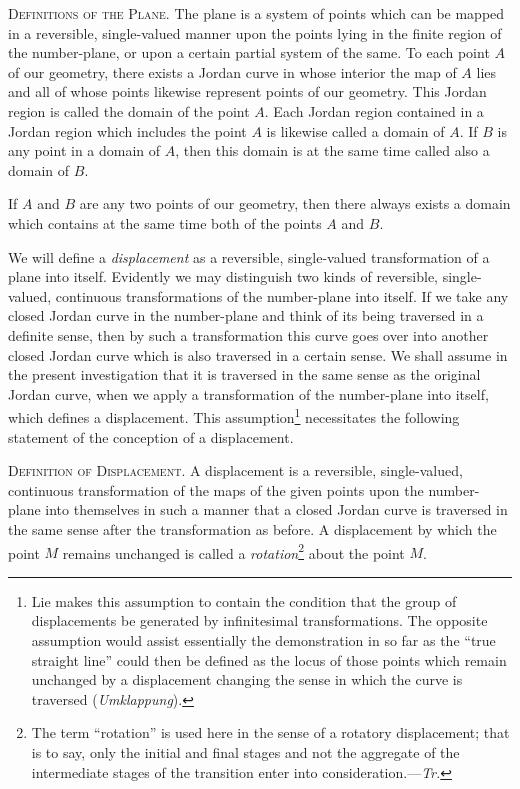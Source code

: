 \documentclass[11pt,oneside]{book}
\begin{document}
{\scshape Definitions of the Plane.} The plane is a system
of points which can be mapped in a reversible, single-valued
manner upon the points lying in the finite region
of the number-plane, or upon a certain partial
system of the same. To each point $A$ of our geometry,
there exists a Jordan curve in whose interior the
map of $A$ lies and all of whose points likewise represent
points of our geometry. This Jordan region is
called the domain of the point $A$. Each Jordan region
contained in a Jordan region which includes the point
$A$ is likewise called a domain of $A$. If $B$ is any point
in a domain of $A$, then this domain is at the same
time called also a domain of $B$.

If $A$ and $B$ are any two points of our geometry,
then there always exists a domain which contains at
the same time both of the points $A$ and $B$.

We will define a \textit{displacement} as a reversible, single-valued
transformation of a plane into itself. Evidently
we may distinguish two kinds of reversible,
single-valued, continuous transformations of the number-plane
into itself. If we take any closed Jordan
curve in the number-plane and think of its being traversed
in a definite sense, then by such a transformation
this curve goes over into another closed Jordan
curve which is also traversed in a certain sense. We
shall assume in the present investigation that it is
traversed in the same sense as the original Jordan
curve, when we apply a transformation of the number-plane
into itself, which defines a displacement. This
assumption\footnote{Lie makes this assumption to contain the condition that the group of
displacements be generated by infinitesimal transformations. The opposite
assumption would assist essentially the demonstration in so far as the ``true
straight line'' could then be defined as the locus of those points which remain
unchanged by a displacement changing the sense in which the curve is
traversed (\textit{Umklappung}).}
necessitates the following statement of
the conception of a displacement.

{\scshape Definition of Displacement.} A displacement is
a reversible, single-valued, continuous transformation
of the maps of the given points upon the number-plane
into themselves in such a manner that a closed Jordan
curve is traversed in the same sense after the transformation
as before. A displacement by which the
point $M$ remains unchanged is called
a \textit{rotation}\footnote{The term ``rotation'' is used here in the
sense of a rotatory displacement;
that is to say, only the initial and final stages and not the aggregate of
the intermediate stages of the transition enter into consideration.---\textit{Tr.}}
about
the point $M$.
\end{document}

